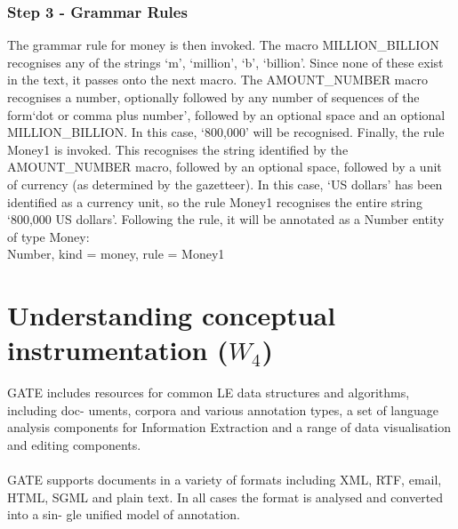 \documentclass[a4paper,12pt]{report}
\begin{document}
\subsection{Step 3 - Grammar Rules}



The grammar rule for money is then invoked. The macro MILLION\_BILLION recognises
any of the strings ‘m’, ‘million’, ‘b’, ‘billion’. Since none of these exist in the text, it passes
onto the next macro. The AMOUNT\_NUMBER macro recognises a number, optionally
followed by any number of sequences of the form‘dot or comma plus number’, followed
by an optional space and an optional MILLION\_BILLION. In this case, ‘800,000’ will be
recognised. Finally, the rule Money1 is invoked. This recognises the string identified by the
AMOUNT\_NUMBER macro, followed by an optional space, followed by a unit of currency
(as determined by the gazetteer). In this case, ‘US dollars’ has been identified as a currency
unit, so the rule Money1 recognises the entire string ‘800,000 US dollars’. Following the rule,
it will be annotated as a Number entity of type Money:\\
Number, kind = money, rule = Money1










\chapter{Understanding conceptual instrumentation ($W_4$)}

GATE includes resources for common LE data structures and algorithms, including doc-
uments, corpora and various annotation types, a set of language analysis components for
Information Extraction and a range of data visualisation and editing components.
\\\\
GATE supports documents in a variety of formats including XML, RTF, email, HTML,
SGML and plain text. In all cases the format is analysed and converted into a sin-
gle unified model of annotation.
\\
\\
\\
\end{document}

